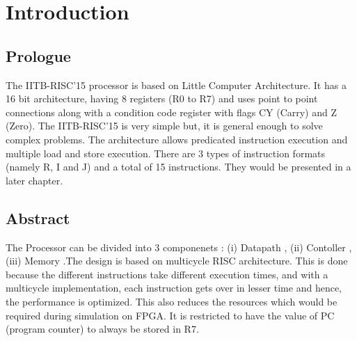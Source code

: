 \documentclass[11pt,fleqn,oneside]{book} %
\let\cleardoublepage\clearpage
\begin{document}



\pagestyle{empty} %

\tableofcontents %


\pagestyle{fancy} %


\chapter{Introduction}

\section{Prologue}
The IITB-RISC'15 processor is based on Little Computer Architecture. It has a 16 bit architecture, having 8 registers (R0 to R7) and uses point to point connections along with a condition code register with flags CY (Carry) and Z (Zero). The IITB-RISC'15 is very simple but, it is general enough to solve complex problems. The architecture allows predicated instruction execution and multiple load and store execution. There are 3 types of instruction formats (namely R, I and J) and a total of 15 instructions. They would be presented in a later chapter.   


\section{Abstract}
The Processor can be divided into 3 componenets : (i) Datapath , (ii) Contoller , (iii) Memory .The design is based on multicycle RISC architecture. This is done because the different instructions take different execution times, and with a multicycle implementation, each instruction gets over in lesser time and hence, the performance is optimized. This also reduces the resources which would be required during simulation on FPGA. It is restricted to have the value of PC (program counter) to always be stored in R7.
\end{document}
